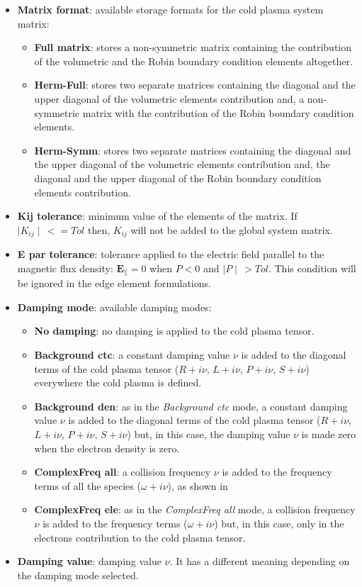 \begin{itemize}\itemsep1em 
	\item \textbf{Matrix format}: available storage formats for the cold plasma system matrix:
	\begin{itemize}\itemsep0.75em 
		\item \textbf{Full matrix}: stores a non-symmetric matrix containing the contribution of the volumetric and the Robin boundary condition elements altogether.
		\quad
		\item \textbf{Herm-Full}: stores two separate matrices containing the diagonal and the upper diagonal of the volumetric elements contribution and, a non-symmetric matrix with the contribution of the Robin boundary condition elements.
		\quad
		\item \textbf{Herm-Symm}: stores two separate matrices containing the diagonal and the upper diagonal of the volumetric elements contribution and, the diagonal and the upper diagonal of the Robin boundary condition elements contribution.
	\end{itemize}
	\item \textbf{Kij tolerance}: minimum value of the elements of the matrix. If $\mid K_{ij} \mid\, <= Tol$ then, $K_{ij}$ will not be added to the global system matrix.
	\item \textbf{E par tolerance}: tolerance applied to the electric field parallel to the magnetic flux density: $\textbf{E}_{\parallel} = 0$ when $P < 0$ and $\mid P \mid\, > Tol$. This condition will be ignored in the edge element formulations. 
	\item \textbf{Damping mode}: available damping modes:
	\begin{itemize}\itemsep0.75em 
	    \item \textbf{No damping}: no damping is applied to the cold plasma tensor.
	    \quad
	    \item \textbf{Background ctc}: a constant damping value $\nu$ is added to the diagonal terms of the cold plasma tensor ($R + i\nu$, $L + i\nu$, $P + i\nu$, $S + i\nu$) everywhere the cold plasma is defined.
	    \quad
	    \item \textbf{Background den}: as in the \emph{Background ctc} mode, a constant damping value $\nu$ is added to the diagonal terms of the cold plasma tensor ($R + i\nu$, $L + i\nu$, $P + i\nu$, $S + i\nu$) but, in this case, the damping value $\nu$ is made zero when the electron density is zero.
	    \quad
	    \item \textbf{ComplexFreq all}: a collision frequency $\nu$ is added to the frequency terms of all the species ($\omega + i\nu$), as shown in \cite{Swanson}
	    \quad
	    \item \textbf{ComplexFreq ele}: as in the \emph{ComplexFreq all} mode, a collision frequency $\nu$ is added to the frequency terms ($\omega + i\nu$) but, in this case, only in the electrons contribution to the cold plasma tensor.
    \end{itemize}	
	\item \textbf{Damping value}: damping value $\nu$. It has a different meaning depending on the damping mode selected.
\end{itemize}

